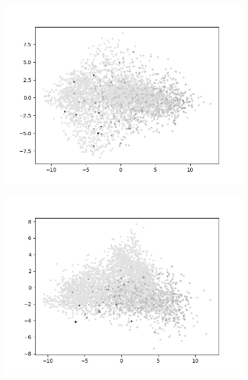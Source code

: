 \begin{figure}[H]
    \centering
    \begin{subfigure}{.25\textwidth}
        \centering
        \includegraphics[width=\textwidth]{images/figures/experiments_latent/pooling_dim1024_PCA_dsm.png}
    \end{subfigure}%
    \begin{subfigure}{.25\textwidth}
        \centering
        \includegraphics[width=\textwidth]{images/figures/experiments_latent/pooling_dim512_PCA_dsm.png}
    \end{subfigure}%
    \begin{subfigure}{.25\textwidth}
        \centering

\end{subfigure}
\end{figure}

